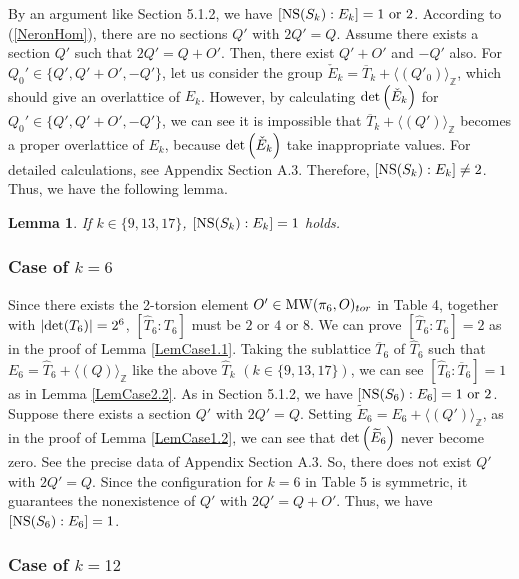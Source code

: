 \documentclass[10pt]{article}
\newtheorem{lem}{Lemma}[section]
\begin{document}
By an argument like Section 5.1.2, we have $[{\rm NS}(S_k):E_k]=1 \text{ or } 2$.
According to (\ref{NeronHom}), there are no sections $Q'$ with $2Q'=Q$.
Assume there exists a section $Q'$ such that $2Q' = Q+O'$.
Then, there exist $Q'+O'$ and $-Q'$ also.
For $Q_0' \in \{Q', Q'+O', -Q' \}$, let us consider the group $\check{E}_k = \overline{T}_k +\langle (Q'_0) \rangle_\mathbb{Z}$, which should give an overlattice of $E_k$.
However, by calculating ${\rm det}\left( \check{E}_k \right)$ for $Q_0' \in \{Q', Q'+O', -Q' \}$, 
we can see  it is impossible that   $\overline{T}_k +\langle (Q')\rangle_\mathbb{Z} $  becomes  a proper overlattice of $E_k$,
because ${\rm det}\left( \check{E}_k \right)$  take inappropriate values.
For detailed calculations, see Appendix Section A.3.
Therefore, $[{\rm NS}(S_k):E_k] \not= 2$. 
Thus, we have the following lemma.
 
\begin{lem}\label{LemCase2.3}
If $k\in \{9,13,17\}$,   $\left[{\rm NS}(S_k): E_k \right] =1$ holds.
\end{lem}

\subsubsection{Case of $k=6$}

Since there exists the 2-torsion element $O'\in {\rm MW}(\pi_6,O)_{tor}$ in Table 4,  together with $|{\rm det}(T_{6})| = 2^6$, $\left[\widehat{T}_6 : T_6 \right]$  must be $2 \text{ or } 4 \text{ or } 8.$
We can prove $\left[\widehat{T}_6:T_6\right]=2$ as in the proof of Lemma \ref{LemCase1.1}.
Taking  the sublattice $\overline{T}_6 $ of $\widehat{T}_6$ such that $E_6=\widehat{T}_6 +\langle (Q) \rangle_\mathbb{Z}$ like the above $\widehat{T}_{k}$ $(k\in \{9,13,17\})$,
 we can see $\left[\widehat{T}_6 : \overline{T}_6\right] =1  $ as in Lemma \ref{LemCase2.2}.
As in Section 5.1.2, we have $[{\rm NS}(S_6):E_6]=1 \text{ or } 2$.
Suppose there exists a section $Q'$ with $2 Q' = Q.$
Setting $\widetilde{E}_6 = E_6 + \langle (Q') \rangle_\mathbb{Z}$, 
as in the proof of Lemma \ref{LemCase1.2}, we can see that ${\rm det}\left(\widetilde{E}_6\right)$ never become zero.
See the precise data of Appendix Section A.3.
So, there does not exist $Q'$ with $2Q'=Q$.
Since the configuration  for $k=6$ in Table 5 is symmetric,  it guarantees the nonexistence of $Q'$ with $2Q' =Q +O'$.
Thus, we have $[{\rm NS}(S_6): E_6]=1$.  


\subsubsection{Case of $k=12$}
\end{document}
